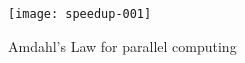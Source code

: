 \begin{figure}[t]
  \label{fig:amdahl}
  \centering
\texttt{[image: speedup-001]}
\caption{Amdahl's Law for parallel computing}
\end{figure}
